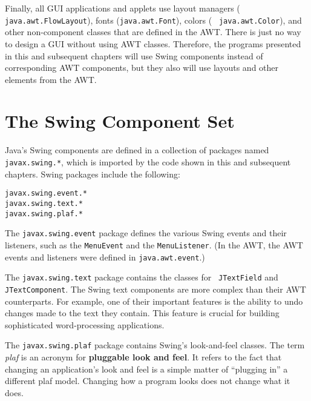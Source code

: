 Finally, all GUI applications and applets use layout managers ({\tt
java.\-awt.FlowLayout}), fonts ({\tt java.awt.Font}), colors ( {\tt
java.awt.Color}), and other non-component classes that are defined in
the AWT. There is just no way to design a GUI without using AWT classes.
Therefore, the programs presented in this and subsequent chapters will
use Swing components instead of corresponding AWT components, but
they also will use layouts and other elements from the AWT.



\section{The Swing Component Set}
\label{the-swing-component-set}

\noindent Java's Swing components are defined in a
collection of packages named {\tt javax.swing.*}, which is imported by
the code shown in this and subsequent chapters.  Swing packages
include the following:

\begin{jjjlisting}
\begin{lstlisting}
javax.swing.event.*
javax.swing.text.*
javax.swing.plaf.*
\end{lstlisting}
\end{jjjlisting}

\noindent The {\tt javax.swing.event} package defines the
various Swing events and their listeners, such as the {\tt MenuEvent}
and the {\tt MenuListener}.  (In the AWT, the AWT events and
listeners were defined in {\tt java.awt.event}.)

The {\tt javax.swing.text} package contains the classes for {\tt
JTextField} and {\tt JTextComponent}.  The Swing text components are
more complex than their AWT counterparts.  For example, one of their
important features is the ability to undo changes made to the text
they contain.  This feature is crucial for building sophisticated
word-processing applications.

The {\tt javax.swing.plaf} package contains Swing's look-and-feel
classes.  The term {\it plaf} is an acronym for {\bf pluggable
look and feel}. It refers to the fact that changing an application's
look and feel is a simple matter of ``plugging in'' a different plaf
model.  Changing how a program looks does not change what it does.

